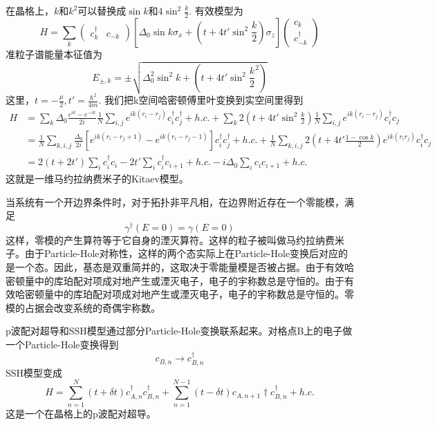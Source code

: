 \documentclass{article}
\numberwithin{equation}{subsection}
\begin{document}
在晶格上，$k$和$k^2$可以替换成$\sin k$和$4\sin^2\frac{k}{2}$. 有效模型为
\begin{equation}
    H=\sum_{k}\begin{pmatrix}
        c_k^\dagger&c_{-k}
    \end{pmatrix}\left[\Delta_0\sin k\sigma_x+(t+4t'\sin^2\frac{k}{2})\sigma_z\right]\begin{pmatrix}
        c_k\\
        c_{-k}^\dagger
    \end{pmatrix}
\end{equation}
准粒子谱能量本征值为
\begin{equation}
    E_{\pm,k}=\pm\sqrt{\Delta_0^2\sin^2 k+(t+4t'\sin^2\frac{k}{2}^2)}
\end{equation}
这里，$t=-\frac{\mu}{2},t'=\frac{\hbar^2}{4m}$. 我们把k空间哈密顿傅里叶变换到实空间里得到
\begin{equation}
    \begin{split}
        H&=\sum_{k}\Delta_0\frac{e^{ik}-e^{-ik}}{2i}\frac{1}{N}\sum_{i,j}e^{ik(r_i-r_j)}c_i^\dagger c_j^\dagger+h.c.+\sum_{k}2(t+4t'\sin^2\frac{k}{2})\frac{1}{N}\sum_{i,j}e^{ik(r_i-r_j)}c_i^\dagger c_j\\
        &=\frac{1}{N}\sum_{k,i,j}\frac{\Delta_0}{2i}[e^{ik(r_i-r_j+1)}-e^{ik(r_i-r_j-1)}]c_i^\dagger c_j^\dagger+h.c.+\frac{1}{N}\sum_{k,i,j}2(t+4t'\frac{1-\cos k}{2})e^{ik(r_ir_j)}c_i^\dagger c_j\\
        &=2(t+2t')\sum_{i}c_i^\dagger c_i-2t'\sum_{i}c_i^\dagger c_{i+1}+h.c.-i\Delta_0\sum_{i}c_ic_{i+1}+h.c.
    \end{split}
\end{equation}
这就是一维马约拉纳费米子的Kitaev模型。

当系统有一个开边界条件时，对于拓扑非平凡相，在边界附近存在一个零能模，满足
\begin{equation}
    \gamma^\dagger(E=0)=\gamma(E=0)
\end{equation}
这样，零模的产生算符等于它自身的湮灭算符。这样的粒子被叫做马约拉纳费米子。由于Particle-Hole对称性，这样的两个态实际上在Particle-Hole变换后对应的是一个态。因此，基态是双重简并的，这取决于零能量模是否被占据。由于有效哈密顿量中的库珀配对项成对地产生或湮灭电子，电子的宇称数总是守恒的。由于有效哈密顿量中的库珀配对项成对地产生或湮灭电子，电子的宇称数总是守恒的。零模的占据会改变系统的奇偶宇称数。

p波配对超导和SSH模型通过部分Particle-Hole变换联系起来。对格点B上的电子做一个Particle-Hole变换得到
\begin{equation}
    c_{B,n}\rightarrow c_{B,n}^\dagger
\end{equation}
SSH模型变成
\begin{equation}
    H=\sum_{n=1}^N(t+\delta t)c_{A,n}^\dagger c_{B,n}^\dagger+\sum_{n=1}^{N-1}(t-\delta t)c_{A,n+1}\dagger c_{B,n}^\dagger+h.c.
\end{equation}
这是一个在晶格上的p波配对超导。
\end{document}

